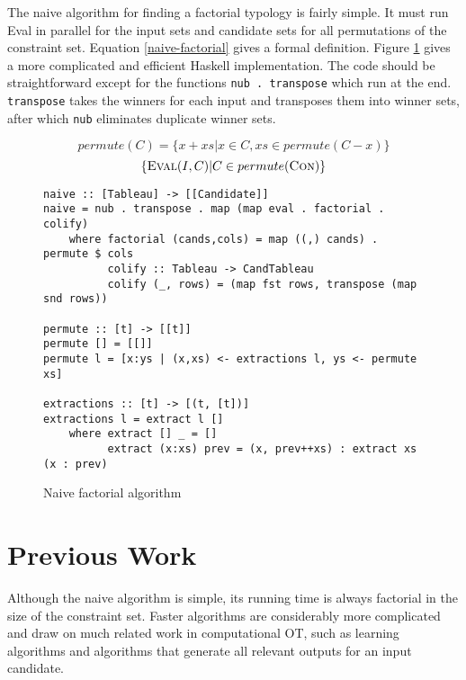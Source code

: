 \documentclass[11pt]{article}
\begin{document}
The naive algorithm for finding a factorial typology is fairly
simple. It must run {\sc Eval} in parallel for the input sets and
candidate sets for all permutations of the constraint set. Equation
\ref{naive-factorial} gives a formal definition. Figure
\ref{naive-factorial-haskell} gives a more complicated and efficient Haskell
implementation. The code should be straightforward except for the
functions \verb+nub . transpose+ which run at the end. {\tt transpose}
takes the winners for each input and transposes them into winner sets,
after which {\tt nub} eliminates duplicate winner sets.

\begin{equation}
permute(C)= \{x+xs | x \in C, xs \in permute(C - x) \}
  \label{naive-factorial}
\end{equation}
\begin{equation}
\{\textrm{\sc Eval}(I, C) | C \in permute(\textrm{\sc Con}) \}
  \label{naive-factorial2}
\end{equation}
\begin{figure}
\begin{verbatim}
naive :: [Tableau] -> [[Candidate]]
naive = nub . transpose . map (map eval . factorial . colify)
    where factorial (cands,cols) = map ((,) cands) . permute $ cols
          colify :: Tableau -> CandTableau
          colify (_, rows) = (map fst rows, transpose (map snd rows))

permute :: [t] -> [[t]]
permute [] = [[]]
permute l = [x:ys | (x,xs) <- extractions l, ys <- permute xs]

extractions :: [t] -> [(t, [t])]
extractions l = extract l []
    where extract [] _ = []
          extract (x:xs) prev = (x, prev++xs) : extract xs (x : prev)
\end{verbatim}
  \caption{Naive factorial algorithm}
  \label{naive-factorial-haskell}
\end{figure}

\section{Previous Work}

Although the naive algorithm is simple, its running time is always
factorial in the size of the constraint set. Faster algorithms are considerably more
complicated and draw on much related work in computational OT, such as
learning algorithms and algorithms that generate all relevant outputs
for an input candidate.
\end{document}
